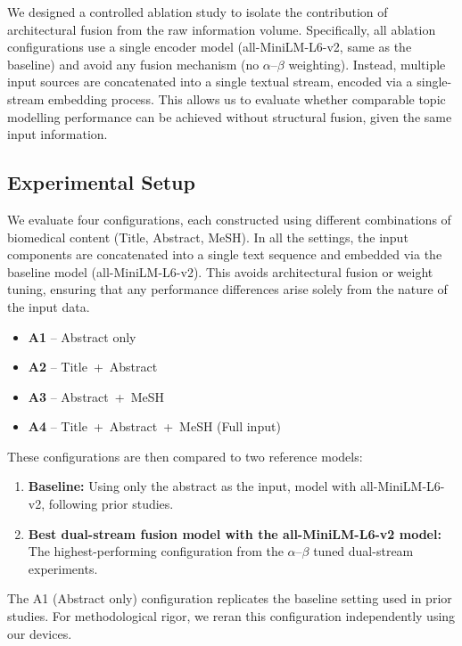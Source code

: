 \documentclass[utf8]{FrontiersinHarvard}
\begin{document}
We designed a controlled ablation study to isolate the contribution of architectural fusion from the raw information volume. Specifically, all ablation configurations use a single encoder model (all-MiniLM-L6-v2, same as the baseline) and avoid any fusion mechanism (no $\alpha$--$\beta$ weighting). Instead, multiple input sources are concatenated into a single textual stream, encoded via a single-stream embedding process. This allows us to evaluate whether comparable topic modelling performance can be achieved without structural fusion, given the same input information.

\subsection{Experimental Setup}

We evaluate four configurations, each constructed using different combinations of biomedical content (Title, Abstract, MeSH). In all the settings, the input components are concatenated into a single text sequence and embedded via the baseline model (all-MiniLM-L6-v2). This avoids architectural fusion or weight tuning, ensuring that any performance differences arise solely from the nature of the input data.

\begin{itemize}[leftmargin=*]
    \item \textbf{A1} -- Abstract only
    \item \textbf{A2} -- Title~+~Abstract
    \item \textbf{A3} -- Abstract~+~MeSH
    \item \textbf{A4} -- Title~+~Abstract~+~MeSH (Full input)
\end{itemize}

These configurations are then compared to two reference models:
\begin{enumerate}[leftmargin=*,label=\arabic*)]
    \item \textbf{Baseline:} Using only the abstract as the input, model with all-MiniLM-L6-v2, following prior studies.
    \item \textbf{Best dual-stream fusion model with the all-MiniLM-L6-v2 model:} The highest-performing configuration from the $\alpha$--$\beta$ tuned dual-stream experiments.
\end{enumerate}

The A1 (Abstract only) configuration replicates the baseline setting used in prior studies. For methodological rigor, we reran this configuration independently using our devices.
\end{document}
